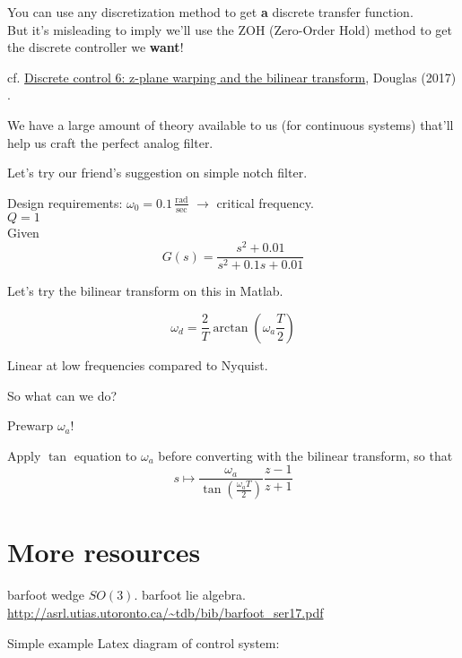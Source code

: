 \documentclass[10pt]{amsart}
\begin{document}
\begin{multicols*}{2}
You can use any discretization method to get \textbf{a} discrete transfer function. \\
But it's misleading to imply we'll use the ZOH (Zero-Order Hold) method to get the discrete controller we \textbf{want}!

cf. \href{https://youtu.be/NRbGPgcLhU0}{Discrete control 6: z-plane warping and the bilinear transform}, Douglas (2017) \cite{Doug2017}.

We have a large amount of theory available to us (for continuous systems) that'll help us craft the perfect analog filter.

Let's try our friend's suggestion on simple notch filter.

Design requirements: $\omega_0 = 0.1 \, \frac{ \text{rad} }{ \text{sec} }$ $\to $ critical frequency. \\
\phantom{Design requirements: } $Q=1$ \\

Given
\[
\boxed{ G(s) = \frac{s^2 + 0.01}{ s^2 + 0.1s + 0.01} }
\]

Let's try the bilinear transform on this in Matlab.


\begin{equation}
\omega_d = \frac{2}{T} \arctan{ \left( \omega_a \frac{T}{2} \right) }
\end{equation}

Linear at low frequencies compared to Nyquist. 

So what can we do?

Prewarp $\omega_a$!

Apply $\tan$ equation to $\omega_a$ before converting with the bilinear transform, so that
\[
s \mapsto \frac{ \omega_a}{\tan{\left(\frac{\omega_aT}{2}\right)}} \frac{z-1}{z+1}
\]



\section{More resources}

barfoot wedge $SO(3)$. barfoot lie algebra. \url{http://asrl.utias.utoronto.ca/~tdb/bib/barfoot_ser17.pdf}

Simple example Latex diagram of control system:




\end{multicols*}
\end{document}
